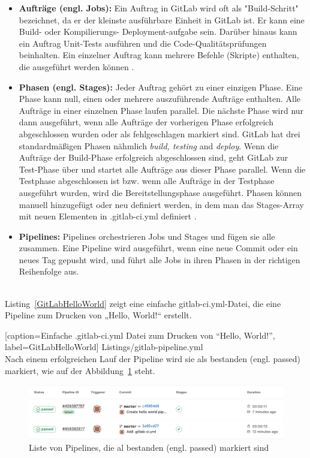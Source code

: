 \begin{itemize}
	
	\item \textbf{Aufträge (engl. Jobs):} Ein Auftrag in GitLab wird oft als "Build-Schritt" bezeichnet, da er der kleinste ausführbare Einheit in GitLab ist. Er kann eine Build- oder Kompilierungs- Deployment-aufgabe sein. Darüber hinaus kann ein Auftrag Unit-Tests ausführen und die Code-Qualitätsprüfungen beinhalten. Ein einzelner Auftrag kann mehrere Befehle (Skripte) enthalten, die ausgeführt werden können \cite{GitLab:jobs}.
	
	\item \textbf{Phasen (engl. Stages):} Jeder Auftrag gehört zu einer einzigen Phase. Eine Phase kann null, einen oder mehrere auszuführende Aufträge enthalten. Alle Aufträge in einer einzelnen Phase laufen parallel. Die nächste Phase wird nur dann ausgeführt, wenn alle Aufträge der vorherigen Phase erfolgreich abgeschlossen wurden oder als fehlgeschlagen markiert sind.
	GitLab hat drei standardmäßigen Phasen nähmlich \textit{build, testing} and \textit{deploy}. Wenn die Aufträge der Build-Phase erfolgreich abgeschlossen sind, geht GitLab zur Test-Phase über und startet alle Aufträge aus dieser Phase parallel. Wenn die Testphase abgeschlossen ist bzw. wenn alle Aufträge in der Testphase ausgeführt wurden, wird die Bereitstellungsphase ausgeführt. Phasen können manuell hinzugefügt oder neu definiert werden, in dem man das Stages-Array mit neuen Elementen in .gitlab-ci.yml definiert \cite{GitLab:stages}.
	
	\item \textbf{Pipelines:} Pipelines orchestrieren Jobs und Stages und fügen sie alle zusammen. Eine Pipeline wird ausgeführt, wenn eine neue Commit oder ein neues Tag gepusht wird, und führt alle Jobs in ihren Phasen in der richtigen Reihenfolge aus.
	
\end{itemize}
\ \\
Listing~\ref{GitLabHelloWorld} zeigt eine einfache gitlab-ci.yml-Datei, die eine Pipeline zum Drucken von „Hello, World!“ erstellt.


[caption={Einfache .gitlab-ci.yml Datei zum Drucken von “Hello, World!”}, label=GitLabHelloWorld]
{Listings/gitlab-pipeline.yml}
\ \\
Nach einem erfolgreichen Lauf der Pipeline wird sie als bestanden (engl. passed) markiert, wie auf der Abbildung~\ref{fig:GitLabPipeLinePassed} steht.

\begin{figure}[!htbp]%
	\centering
	\includegraphics[width=1.0\textwidth]{Graphics/GitLab-passed_pipeline.png}
	\caption{Liste von Pipelines, die al bestanden (engl. passed) markiert sind}
	\label{fig:GitLabPipeLinePassed}
\end{figure}
 
